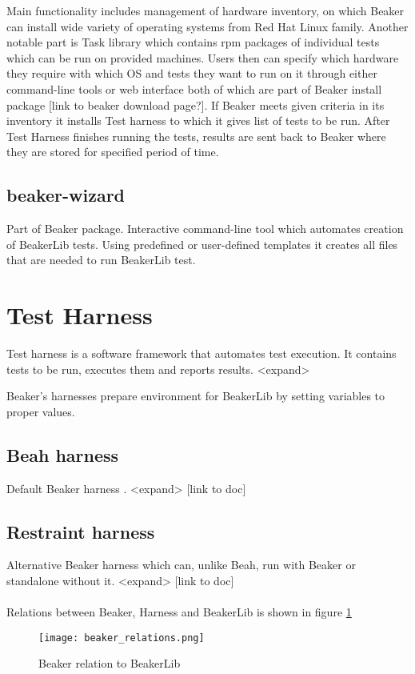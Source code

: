 Main functionality includes management of hardware inventory, on which Beaker can install wide variety  of operating systems from Red Hat Linux family. Another notable part  is Task library which contains rpm packages of individual tests which can be run on provided machines. 
Users then can specify which hardware they require with which OS and tests they want to run on it through either command-line tools or web interface both of which are part of Beaker install package [link to beaker download page?]. If Beaker meets given criteria in its inventory it installs Test harness to which it gives list of tests to be run.  After Test Harness finishes running the tests, results are sent back to Beaker where they are stored for specified period of time. 

\subsection{beaker-wizard}
Part of Beaker package. Interactive command-line tool which automates creation of BeakerLib tests. Using predefined or user-defined templates it creates all files that are needed to run BeakerLib test.

\section{Test Harness}
Test harness is a software framework that automates test execution. It contains tests to be run, executes them and reports results. <expand>

Beaker’s harnesses prepare environment for BeakerLib by setting variables to proper values.

\subsection{Beah harness}
Default Beaker harness . <expand> [link to doc]

\subsection{Restraint harness}
Alternative Beaker harness which can, unlike Beah, run with Beaker or standalone without it. <expand> [link to doc]
\\
\\
Relations between Beaker, Harness and BeakerLib is shown in figure \ref{fig:beaker_relation}

\begin{figure}[h!]
  \texttt{[image: beaker\_relations.png]}
  \caption{Beaker relation to BeakerLib}
  \label{fig:beaker_relation}
\end{figure}




